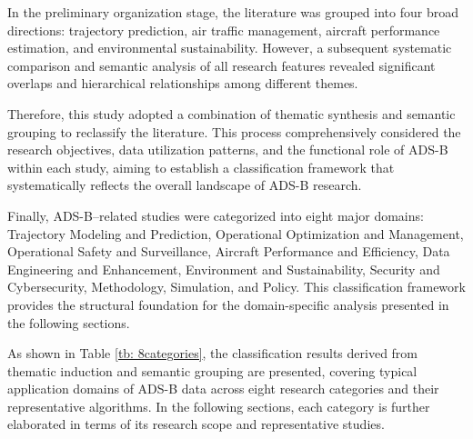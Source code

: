 In the preliminary organization stage, the literature was grouped into four broad directions: trajectory prediction, air traffic management, aircraft performance estimation, and environmental sustainability. However, a subsequent systematic comparison and semantic analysis of all research features revealed significant overlaps and hierarchical relationships among different themes.

Therefore, this study adopted a combination of thematic synthesis and semantic grouping to reclassify the literature. This process comprehensively considered the research objectives, data utilization patterns, and the functional role of ADS-B within each study, aiming to establish a classification framework that systematically reflects the overall landscape of ADS-B research.

Finally, ADS-B–related studies were categorized into eight major domains:
Trajectory Modeling and Prediction, Operational Optimization and Management, Operational Safety and Surveillance, Aircraft Performance and Efficiency, Data Engineering and Enhancement, Environment and Sustainability, Security and Cybersecurity, Methodology, Simulation, and Policy.
This classification framework provides the structural foundation for the domain-specific analysis presented in the following sections.

As shown in Table \ref{tb: 8categories}, the classification results derived from thematic induction and semantic grouping are presented, covering typical application domains of ADS-B data across eight research categories and their representative algorithms. In the following sections, each category is further elaborated in terms of its research scope and representative studies.



